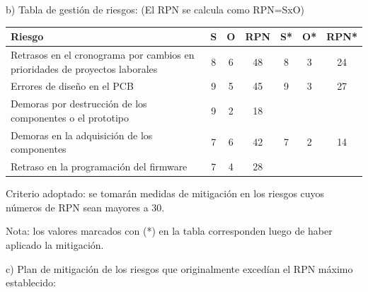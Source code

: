 \documentclass[
11pt, %
]{charter}
\begin{document}
b) Tabla de gestión de riesgos:      (El RPN se calcula como RPN=SxO)

\begin{table}[htpb]
\centering
\begin{tabularx}{\linewidth}{@{}|X|c|c|c|c|c|c|@{}}
\hline
\rowcolor[HTML]{C0C0C0} 
Riesgo &                                                                                                                         S & O & RPN & S* & O* & RPN* \\ \hline
Retrasos en el cronograma por cambios en prioridades de proyectos laborales &   	8&  6 &     48&    8&   3&     24  \\ \hline
Errores de diseño en el PCB&   				 					9&   5&     45&    9&   3&     27  \\ \hline
Demoras por destrucción de los componentes o el prototipo&  				9&   2&     18&      &     &           \\ \hline
Demoras en la adquisición de los componentes&   						7&   6&     42&    7&   2&     14  \\ \hline
Retraso en la programación del firmware &  		 					7&   4&    28&       &     &           \\ \hline
\end{tabularx}%
\end{table}

Criterio adoptado: se tomarán medidas de mitigación en los riesgos cuyos números de RPN sean mayores a 30.

Nota: los valores marcados con (*) en la tabla corresponden luego de haber aplicado la mitigación.


c) Plan de mitigación de los riesgos que originalmente excedían el RPN máximo establecido: 
\end{document}
